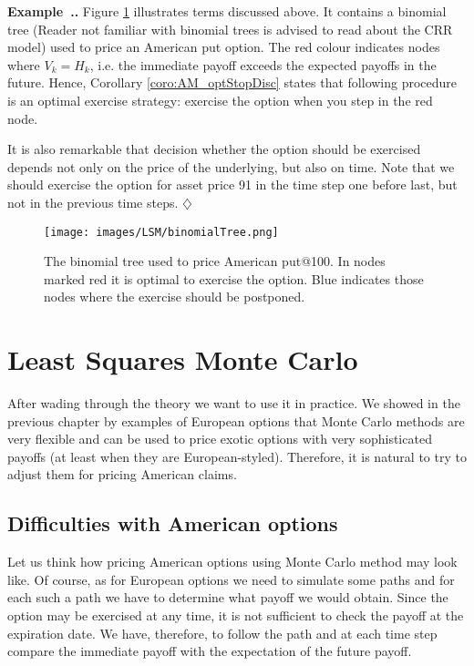 \documentclass[a4paper,11pt, twoside]{book}
\theoremstyle{definition}
\theoremstyle{remark}
\newcounter{example}[chapter]
\newenvironment{example}
   {\refstepcounter{example} \par\medskip\noindent \textbf{Example~\arabic{chapter}.\arabic{example}.}  }
   {\hfill $\diamondsuit$\par\noindent\ignorespacesafterend}
\begin{document}
\begin{example}
 Figure \ref{fig:binTree} illustrates terms discussed above. It contains a binomial tree (Reader not familiar with binomial trees is advised to read about the CRR model) used to price an American put option. The red colour indicates nodes where $V_{k} = H_{k}$, i.e. the immediate payoff exceeds the expected payoffs in the future. Hence, Corollary \ref{coro:AM_optStopDisc} states that following procedure is an optimal exercise strategy: exercise the option when you step in the red node.
 
 It is also remarkable that decision whether the option should be exercised depends not only on the price of the underlying, but also on time. Note that we should exercise the option for asset price 91 in the time step one before last, but not in the previous time steps.
\end{example}

\begin{figure}
\centering
 \texttt{[image: images/LSM/binomialTree.png]}
\caption{The binomial tree used to price American put@100. In nodes marked red it is optimal to exercise the option. Blue indicates those nodes where the exercise should be postponed. }
\label{fig:binTree}
\end{figure}

\section{Least Squares Monte Carlo}
After wading through the theory we want to use it in practice. We showed in the previous chapter by examples of European options that Monte Carlo methods are very flexible and can be used to price exotic options with very sophisticated payoffs (at least when they are European-styled). Therefore, it is natural to try to adjust them for pricing American claims. 

\subsection{Difficulties with American options}

Let us think how pricing American options using Monte Carlo method may look like. Of course, as for European options we need to simulate some paths and for each such a path we have to determine what payoff we would obtain. Since the option may be exercised at any time, it is not sufficient to check the payoff at the expiration date. We have, therefore, to follow the path and at each time step compare the immediate payoff with the expectation of the future payoff.
\end{document}
